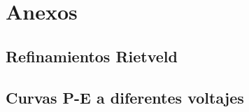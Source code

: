 \documentclass[../main.tex]{subfiles}
\begin{document}
\appendix
\chapter{Anexos}
\section{Refinamientos Rietveld}\label{sec:anexorietveld}
\section{Curvas P-E a diferentes voltajes}
\end{document}
